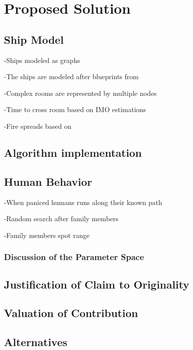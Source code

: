 \chapter{Proposed Solution}
\label{ch:solution}



\section{Ship Model}
-Ships modeled as graphs

-The ships are modeled after blueprints from

-Complex rooms are represented by multiple nodes

-Time to cross room based on IMO estimations

-Fire spreads based on

\section{Algorithm implementation}



\section{Human Behavior}

-When paniced humans runs along their known path

-Random search after family members

-Family members spot range

\subsection{Discussion of the Parameter Space}

\section{Justification of Claim to Originality}

\section{Valuation of Contribution}

\section{Alternatives}
